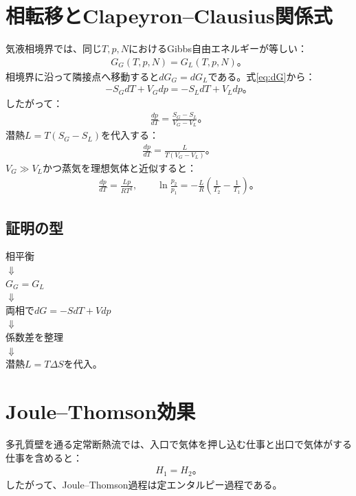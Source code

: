 \documentclass[platex,dvipdfmx,a4paper,10pt]{jsarticle}
\newcommand{\flow}[1]{\begin{center}\begin{minipage}{0.94\textwidth}\centering #1\end{minipage}\end{center}}
\begin{document}
\section{相転移とClapeyron--Clausius関係式}\label{sec:phase}
気液相境界では、同じ$T,p,N$におけるGibbs自由エネルギーが等しい：
\begin{align}
  G_G(T,p,N)=G_L(T,p,N)。\label{eq:phaseeq}
\end{align}
相境界に沿って隣接点へ移動すると$dG_G=dG_L$である。式\eqref{eq:dG}から：
\begin{align*}
  -S_GdT+V_Gdp=-S_LdT+V_Ldp。
\end{align*}
したがって：
\begin{align}
  \frac{dp}{dT}=\frac{S_G-S_L}{V_G-V_L}。\label{eq:clapeyron1}
\end{align}
潜熱$L=T(S_G-S_L)$を代入する：
\begin{align}
  \frac{dp}{dT}=\frac{L}{T(V_G-V_L)}。\label{eq:clapeyron2}
\end{align}
$V_G\gg V_L$かつ蒸気を理想気体と近似すると：
\begin{align}
  \frac{dp}{dT}=\frac{Lp}{RT^2},\qquad
  \ln\frac{p_2}{p_1}=-\frac{L}{R}\left(\frac{1}{T_2}-\frac{1}{T_1}\right)。\label{eq:clausius-integrated}
\end{align}

\subsection{証明の型}
\flow{相平衡\\$\Downarrow$\\$G_G=G_L$\\$\Downarrow$\\両相で$dG=-SdT+Vdp$\\$\Downarrow$\\係数差を整理\\$\Downarrow$\\潜熱$L=T\Delta S$を代入。}

\newpage
\section{Joule--Thomson効果}\label{sec:jt}
多孔質壁を通る定常断熱流では、入口で気体を押し込む仕事と出口で気体がする仕事を含めると：
\begin{align}
  H_1=H_2。\label{eq:isenthalpic}
\end{align}
したがって、Joule--Thomson過程は定エンタルピー過程である。
\end{document}
